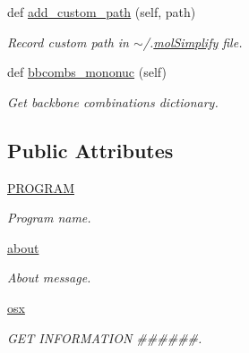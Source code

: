 \begin{DoxyCompactItemize}
def \hyperlink{classmolSimplify_1_1Classes_1_1globalvars_1_1globalvars_aff51debc89dfec45719516008d400cd4}{add\+\_\+custom\+\_\+path} (self, path)
\begin{DoxyCompactList}\small\item\em Record custom path in $\sim$/.\hyperlink{namespacemolSimplify}{mol\+Simplify} file. \end{DoxyCompactList}\item 
def \hyperlink{classmolSimplify_1_1Classes_1_1globalvars_1_1globalvars_ab41702f904534cee14aaca1eeaec3ccd}{bbcombs\+\_\+mononuc} (self)
\begin{DoxyCompactList}\small\item\em Get backbone combinations dictionary. \end{DoxyCompactList}\end{DoxyCompactItemize}
\subsection*{Public Attributes}
\begin{DoxyCompactItemize}
\item 
\hyperlink{classmolSimplify_1_1Classes_1_1globalvars_1_1globalvars_a84928cd131f775a7a5ac771d3115884a}{P\+R\+O\+G\+R\+AM}
\begin{DoxyCompactList}\small\item\em Program name. \end{DoxyCompactList}\item 
\hyperlink{classmolSimplify_1_1Classes_1_1globalvars_1_1globalvars_a8645755df959297ba1969ac81b980d38}{about}
\begin{DoxyCompactList}\small\item\em About message. \end{DoxyCompactList}\item 
\hyperlink{classmolSimplify_1_1Classes_1_1globalvars_1_1globalvars_accca7a3b1858d67c294197ae1b967e07}{osx}
\begin{DoxyCompactList}\small\item\em G\+ET I\+N\+F\+O\+R\+M\+A\+T\+I\+ON \#\#\#\#\#\#. \end{DoxyCompactList}\end{DoxyCompactItemize}
